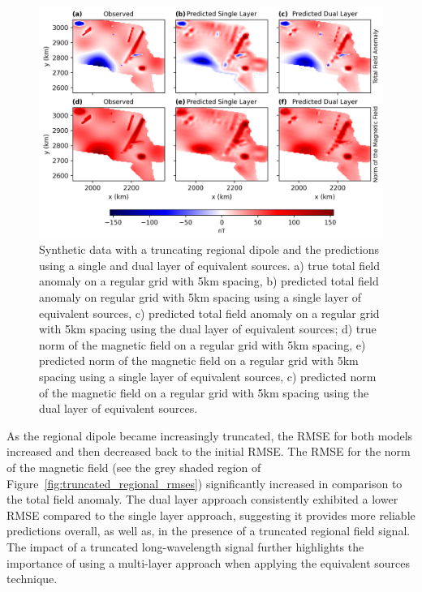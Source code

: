 \begin{figure}[!h]
\centering
\includegraphics[width=1\linewidth]{paper/figures/truncated_regional.png}
\caption{
    Synthetic data with a truncating regional dipole and the predictions using a single and dual layer of equivalent sources. a) true total field anomaly on a regular grid with 5km spacing, b) predicted total field anomaly on regular grid with 5km spacing using a single layer of equivalent sources, c) predicted total field anomaly on a regular grid with 5km spacing using the dual layer of equivalent sources; d) true norm of the magnetic field on a regular grid with 5km spacing, e) predicted norm of the magnetic field on a regular grid with 5km spacing using a single layer of equivalent sources, c) predicted norm of the magnetic field on a regular grid with 5km spacing using the dual layer of equivalent sources.
}
\label{fig:truncated_regional}
\end{figure}


As the regional dipole became increasingly truncated, the RMSE for both models increased and then decreased back to the initial RMSE. The RMSE for the norm of the magnetic field (see the grey shaded region of Figure~\ref{fig:truncated_regional_rmses}) significantly increased in comparison to the total field anomaly. The dual layer approach consistently exhibited a lower RMSE compared to the single layer approach, suggesting it provides more reliable predictions overall, as well as, in the presence of a truncated regional field signal. The impact of a truncated long-wavelength signal further highlights the importance of using a multi-layer approach when applying the equivalent sources technique.

